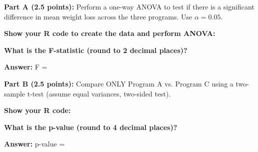 \documentclass[11pt]{article}
\begin{document}
\vspace{0.3cm}

\textbf{Part A (2.5 points):} Perform a one-way ANOVA to test if there is a significant difference in mean weight loss across the three programs. Use $\alpha = 0.05$.

\vspace{0.3cm}

\textbf{Show your R code to create the data and perform ANOVA:}

\vspace{5cm}

\textbf{What is the F-statistic (round to 2 decimal places)?}

\vspace{0.3cm}

\textbf{Answer:} F = \underline{\hspace{3cm}}

\vspace{0.5cm}

\textbf{Part B (2.5 points):} Compare ONLY Program A vs. Program C using a two-sample t-test (assume equal variances, two-sided test).

\vspace{0.3cm}

\textbf{Show your R code:}

\vspace{4cm}

\textbf{What is the p-value (round to 4 decimal places)?}

\vspace{0.3cm}

\textbf{Answer:} p-value = \underline{\hspace{3cm}}

\vspace{1cm}
\end{document}
